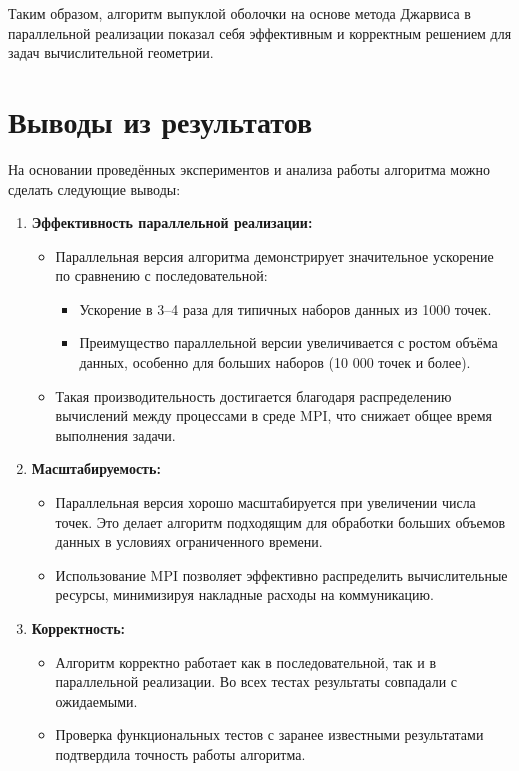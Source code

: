 \documentclass[a4paper,12pt]{article}
\begin{document}
Таким образом, алгоритм выпуклой оболочки на основе метода Джарвиса в параллельной реализации показал себя эффективным и корректным решением для задач вычислительной геометрии.

\newpage

\section{Выводы из результатов}
На основании проведённых экспериментов и анализа работы алгоритма можно сделать следующие выводы:

\begin{enumerate}
    \item \textbf{Эффективность параллельной реализации:}
	\begin{itemize}
		 \item Параллельная версия алгоритма демонстрирует значительное ускорение по сравнению с последовательной:
		\begin{itemize}
		        \item Ускорение в 3–4 раза для типичных наборов данных из 1000 точек.
		        \item Преимущество параллельной версии увеличивается с ростом объёма данных, особенно для больших наборов (10 000 точек и более).
	    	\end{itemize}
		\item Такая производительность достигается благодаря распределению вычислений между процессами в среде MPI, что снижает общее время выполнения задачи.
	\end{itemize}
    \item \textbf{Масштабируемость:}
	\begin{itemize}
	        \item Параллельная версия хорошо масштабируется при увеличении числа точек. Это делает алгоритм подходящим для обработки больших объемов данных в условиях ограниченного времени.
	        \item Использование MPI позволяет эффективно распределить вычислительные ресурсы, минимизируя накладные расходы на коммуникацию.
	\end{itemize}
    \item \textbf{Корректность:}
	\begin{itemize}
		\item Алгоритм корректно работает как в последовательной, так и в параллельной реализации. Во всех тестах результаты совпадали с ожидаемыми.
		\item Проверка функциональных тестов с заранее известными результатами подтвердила точность работы алгоритма.

\end{itemize}
\end{enumerate}
\end{document}

